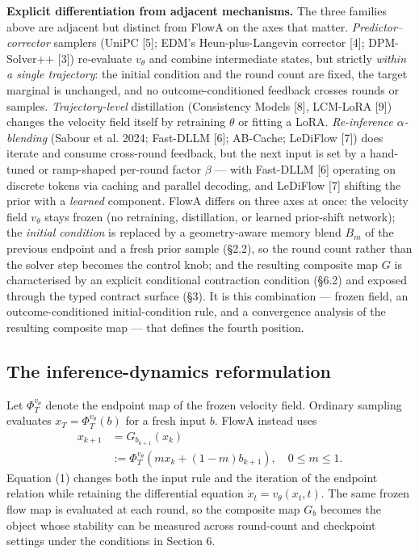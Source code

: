 \documentclass[journal,twocolumn,final]{IEEEtran}
\begin{document}
\textbf{Explicit differentiation from adjacent mechanisms.} The three families above are adjacent but distinct from FlowA on the axes that matter. \emph{Predictor--corrector} samplers (UniPC [5]; EDM's Heun-plus-Langevin corrector [4]; DPM-Solver++ [3]) re-evaluate $v_\theta$ and combine intermediate states, but strictly \emph{within a single trajectory}: the initial condition and the round count are fixed, the target marginal is unchanged, and no outcome-conditioned feedback crosses rounds or samples. \emph{Trajectory-level} distillation (Consistency Models [8], LCM-LoRA [9]) changes the velocity field itself by retraining $\theta$ or fitting a LoRA. \emph{Re-inference $\alpha$-blending} (Sabour et al. 2024; Fast-DLLM [6]; AB-Cache; LeDiFlow [7]) does iterate and consume cross-round feedback, but the next input is set by a hand-tuned or ramp-shaped per-round factor $\beta$ --- with Fast-DLLM [6] operating on discrete tokens via caching and parallel decoding, and LeDiFlow [7] shifting the prior with a \emph{learned} component. FlowA differs on three axes at once: the velocity field $v_\theta$ stays frozen (no retraining, distillation, or learned prior-shift network); the \emph{initial condition} is replaced by a geometry-aware memory blend $B_m$ of the previous endpoint and a fresh prior sample (\S2.2), so the round count rather than the solver step becomes the control knob; and the resulting composite map $G$ is characterised by an explicit conditional contraction condition (\S6.2) and exposed through the typed contract surface (\S3). It is this combination --- frozen field, an outcome-conditioned initial-condition rule, and a convergence analysis of the resulting composite map --- that defines the fourth position.

\subsection{The inference-dynamics reformulation}
\label{sec:reformulation}
Let $\Phi_T^{v_\theta}$ denote the endpoint map of the frozen velocity field. Ordinary sampling evaluates $x_T=\Phi_T^{v_\theta}(b)$ for a fresh input $b$. FlowA instead uses
\begin{equation}
 \begin{aligned}x_{k+1}&=G_{b_{k+1}}(x_k)\\&:=\Phi_T^{v_\theta}\!\left(m x_k+(1-m)b_{k+1}\right),\quad 0\le m\le1.\end{aligned}
\end{equation}
Equation (1) changes both the input rule and the iteration of the endpoint relation while retaining the differential equation $\dot x_t=v_\theta(x_t,t)$. The same frozen flow map is evaluated at each round, so the composite map $G_b$ becomes the object whose stability can be measured across round-count and checkpoint settings under the conditions in Section 6.
\end{document}
